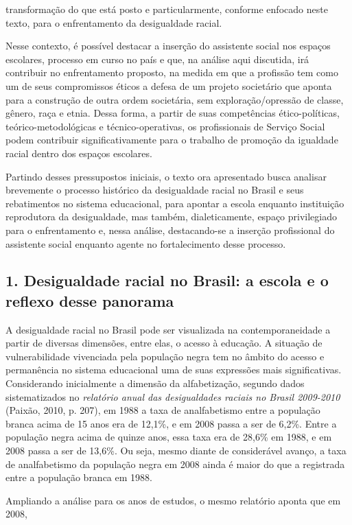  transformação do que está posto e particularmente, conforme enfocado neste texto, para o
 enfrentamento da desigualdade racial.\par Nesse contexto, é possível destacar a inserção do assistente social nos espaços
 escolares, processo em curso no país e que, na análise aqui discutida, irá contribuir no
 enfrentamento proposto, na medida em que a profissão tem como um de seus compromissos
 éticos a defesa de um projeto societário que aponta para a construção de outra ordem
 societária, sem exploração/opressão de classe, gênero, raça e etnia. Dessa forma, a
 partir de suas competências ético-políticas, teórico-metodológicas e técnico-operativas,
 os profissionais de Serviço Social podem contribuir significativamente para o trabalho
 de promoção da igualdade racial dentro dos espaços escolares.\par Partindo desses pressupostos iniciais, o texto ora apresentado busca analisar brevemente
 o processo histórico da desigualdade racial no Brasil e seus rebatimentos no sistema
 educacional, para apontar a escola enquanto instituição reprodutora da desigualdade, mas
 também, dialeticamente, espaço privilegiado para o enfrentamento e, nessa análise,
 destacando-se a inserção profissional do assistente social enquanto agente no
 fortalecimento desse processo.\subsection*{1. Desigualdade racial no Brasil: a escola e o reflexo desse panorama}\par A desigualdade racial no Brasil pode ser visualizada na contemporaneidade a partir de
 diversas dimensões, entre elas, o acesso à educação. A situação de vulnerabilidade
 vivenciada pela população negra tem no âmbito do acesso e permanência no sistema
 educacional uma de suas expressões mais significativas. Considerando inicialmente a
 dimensão da alfabetização, segundo dados sistematizados no \textit{relatório anual
 das desigualdades raciais no Brasil 2009-2010} (Paixão, 2010, p. 207), em
 1988 a taxa de analfabetismo entre a população branca acima de 15 anos era de 12,1\%,
 e em 2008 passa a ser de 6,2\%. Entre a população negra acima de quinze anos, essa
 taxa era de 28,6\% em 1988, e em 2008 passa a ser de 13,6\%. Ou seja, mesmo diante de
 considerável avanço, a taxa de analfabetismo da população negra em 2008 ainda é maior
 do que a registrada entre a população branca em 1988.\par Ampliando a análise para os anos de estudos, o mesmo relatório aponta que em 2008,

